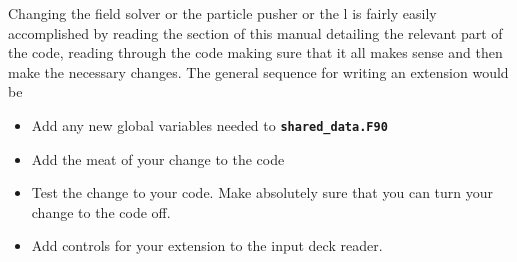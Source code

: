 \documentclass[12pt,a4paper]{article}
\newcommand{\inlinecode}[1]{{\color{warwickred} \bf\texttt{#1}}}
\begin{document}
Changing the field solver or the particle pusher or the l is fairly easily
accomplished by reading the section of this manual detailing the relevant part
of the code, reading through the code making sure that it all makes sense and
then make the necessary changes. The general sequence for writing an extension
would be
\begin{itemize}
\item Add any new global variables needed to \inlinecode{shared\_data.F90}
\item Add the meat of your change to the code
\item Test the change to your code. Make absolutely sure that you can turn your
  change to the code off.
\item Add controls for your extension to the input deck reader.
\end{itemize}
\end{document}
